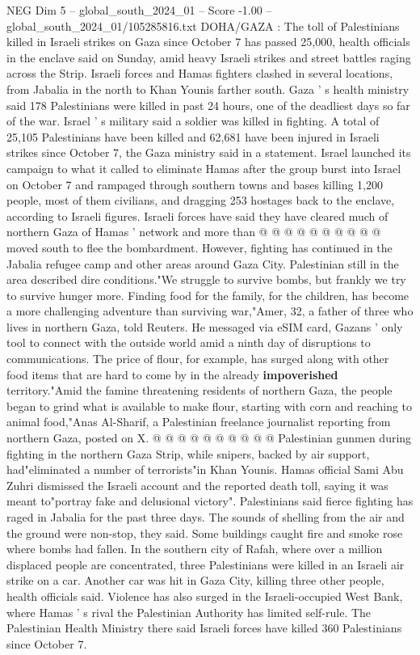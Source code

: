 \begin{textsample}{NEG Dim 5 – global\_south\_2024\_01 – Score -1.00 – global\_south\_2024\_01/105285816.txt}  \label{ex:f5_neg_442}
DOHA/GAZA : The toll of Palestinians killed in Israeli strikes on Gaza since October 7 has passed 25,000, health officials in the enclave said on Sunday, amid heavy Israeli strikes and street battles raging across the Strip.
Israeli forces and Hamas fighters clashed in several locations, from Jabalia in the north to Khan Younis farther south.
Gaza ' s health ministry said 178 Palestinians were killed in past 24 hours, one of the deadliest days so far of the war.
Israel ' s military said a soldier was killed in fighting.
A total of 25,105 Palestinians have been killed and 62,681 have been injured in Israeli strikes since October 7, the Gaza ministry said in a statement.
Israel launched its campaign to what it called to eliminate Hamas after the group burst into Israel on October 7 and rampaged through southern towns and bases killing 1,200 people, most of them civilians, and dragging 253 hostages back to the enclave, according to Israeli figures.
Israeli forces have said they have cleared much of northern Gaza of Hamas ' network and more than @ @ @ @ @ @ @ @ @ @ moved south to flee the bombardment.
However, fighting has continued in the Jabalia refugee camp and other areas around Gaza City.
Palestinian still in the area described dire conditions."We struggle to survive bombs, but frankly we try to survive hunger more.
Finding food for the family, for the children, has become a more challenging adventure than surviving war,"Amer, 32, a father of three who lives in northern Gaza, told Reuters.
He messaged via eSIM card, Gazans ' only tool to connect with the outside world amid a ninth day of disruptions to communications.
The price of flour, for example, has surged along with other food items that are hard to come by in the already \textbf{impoverished} territory."Amid the famine threatening residents of northern Gaza, the people began to grind what is available to make flour, starting with corn and reaching to animal food,"Anas Al-Sharif, a Palestinian freelance journalist reporting from northern Gaza, posted on X. @ @ @ @ @ @ @ @ @ @ Palestinian gunmen during fighting in the northern Gaza Strip, while snipers, backed by air support, had"eliminated a number of terrorists"in Khan Younis.
Hamas official Sami Abu Zuhri dismissed the Israeli account and the reported death toll, saying it was meant to"portray fake and delusional victory".
Palestinians said fierce fighting has raged in Jabalia for the past three days.
The sounds of shelling from the air and the ground were non-stop, they said.
Some buildings caught fire and smoke rose where bombs had fallen.
In the southern city of Rafah, where over a million displaced people are concentrated, three Palestinians were killed in an Israeli air strike on a car.
Another car was hit in Gaza City, killing three other people, health officials said.
Violence has also surged in the Israeli-occupied West Bank, where Hamas ' s rival the Palestinian Authority has limited self-rule.
The Palestinian Health Ministry there said Israeli forces have killed 360 Palestinians since October 7.

\end{textsample}
